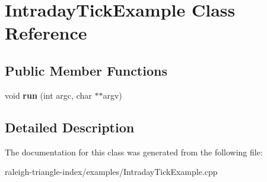\section{Intraday\+Tick\+Example Class Reference}
\label{class_intraday_tick_example}
\subsection*{Public Member Functions}
\begin{DoxyCompactItemize}
\item 
void {\bfseries run} (int argc, char $\ast$$\ast$argv)\label{class_intraday_tick_example_a89b36b5fa8881a7ef9b78f8dd4e8089a}

\end{DoxyCompactItemize}


\subsection{Detailed Description}


The documentation for this class was generated from the following file\+:\begin{DoxyCompactItemize}
\item 
raleigh-\/triangle-\/index/examples/Intraday\+Tick\+Example.\+cpp\end{DoxyCompactItemize}

